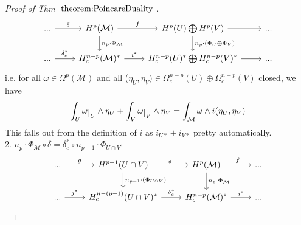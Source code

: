 \documentclass[10pt]{article}
\theoremstyle{plain}
\theoremstyle{definition}
\newcommand{\man}{\mathcal{M}}
\def\restrict#1{\raise-.5ex\hbox{\ensuremath|}_{#1}}
\newcommand{\UintV}{U\cap V}
\begin{document}
\begin{proof}[Proof of Thm $\ref{theorem:PoincareDuality}$]
$$\begin{tikzcd}
... \arrow[r, "\delta"]     & H^p(\mathcal{M}) \arrow[r, "f"] \arrow[d, "n_p \cdot \Phi_\mathcal{M}"] & H^p(U) \bigoplus H^p(V) \arrow[r] \arrow[d, "n_p\cdot(\Phi_U \oplus \Phi_V)"] & ... \\
... \arrow[r, "\delta_c^*"] & H^{n-p}_c(\mathcal{M})^* \arrow[r, "i^*"]                                & H_c^{n-p}(U)^* \bigoplus H_c^{n-p}(V)^* \arrow[r]                             & ...
\end{tikzcd}$$
i.e. for all $\omega \in \Omega^p(\man) $ and all ($\eta_U,\eta_V) \in \Omega_c^{n-p}(U) \oplus \Omega_c^{n-p}(V)$ closed, we have 
$$\int_U \omega\restrict{U} \wedge \eta_U + \int_V \omega\restrict{V} \wedge \eta_V = \int_\man \omega \wedge i(\eta_U,\eta_V)$$
This falls out from the definition of $i$ as $i_{U*} + i_{V*}$ pretty automatically.
\\
2. \underline{$n_p \cdot \Phi_\man \circ \delta = \delta_c^* \circ n_{p-1} \cdot \Phi_{\UintV} $:}
$$%
\begin{tikzcd}
... \arrow[r, "g"]   & H^{p-1}(U\cap V) \arrow[r, "\delta"] \arrow[d, "n_{p-1}\cdot(\Phi_{U\cap V})"] & H^p(\mathcal{M}) \arrow[r, "f"] \arrow[d, "n_p \cdot \Phi_\mathcal{M}"] & ... \\
... \arrow[r, "j^*"] & H^{n-(p-1)}_c(U\cap V)^* \arrow[r, "\delta_c^*"]                                 & H^{n-p}_c(\mathcal{M})^* \arrow[r, "i^*"]                                & ...
\end{tikzcd}
$$

\end{proof}
\end{document}
